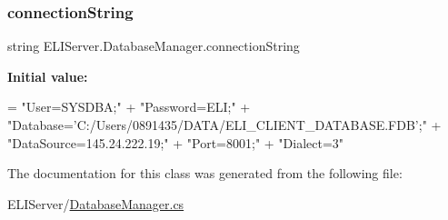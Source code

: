 \subsubsection{\texorpdfstring{connection\+String}{connectionString}}
{\footnotesize\ttfamily string E\+L\+I\+Server.\+Database\+Manager.\+connection\+String\hspace{0.3cm}{\ttfamily [private]}}

{\bfseries Initial value\+:}
\begin{DoxyCode}
=
                        \textcolor{stringliteral}{"User=SYSDBA;"} +
                        \textcolor{stringliteral}{"Password=ELI;"} +
                        \textcolor{stringliteral}{"Database='C:/Users/0891435/DATA/ELI\_CLIENT\_DATABASE.FDB';"} +
                        \textcolor{stringliteral}{"DataSource=145.24.222.19;"} +
                        \textcolor{stringliteral}{"Port=8001;"} +
                        \textcolor{stringliteral}{"Dialect=3"}
\end{DoxyCode}


The documentation for this class was generated from the following file\+:\begin{DoxyCompactItemize}
\item 
E\+L\+I\+Server/\hyperlink{_database_manager_8cs}{Database\+Manager.\+cs}\end{DoxyCompactItemize}
